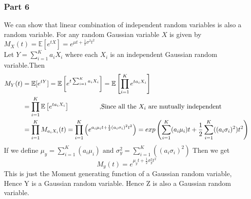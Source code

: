 \subsubsection{Part 6}
    We can show that linear combination of independent random variables is also a random variable. For any random Gaussian variable $X$ is given by $M_X(t)=\mathbb{E}[e^{tX}]=e^{\mu t+\frac{1}{2} \sigma^2t^2}$\\
    Let $Y=\sum_{i=1}^K a_i X_i$ where each $X_i$ is an independent Gaussian random variable.Then 
    \begin{align*}
        M_Y(t) &= \mathbb{E}[e^{tY}]= \mathbb{E}\left[e^{t\sum_{i=1}^K a_i X_i}\right] = \mathbb{E}\left[\prod_{i=1}^Ke^{ta_i X_i}\right]\\
        &=\prod_{i=1}^K\mathbb{E}\left[e^{ta_i X_i}\right] \hspace{15mm} \text{ ,Since all the $X_i$ are mutually independent}\\
        &= \prod_{i=1}^KM_{a_iX_i}(t) =\prod_{i=1}^K\left(  e^{a_i\mu_i t+\frac{1}{2} (a_i\sigma_i)^2t^2}\right) = exp\left({\sum_{i=1}^K(a_i\mu_i) t+\frac{1}{2} \sum_{i=1}^K((a_i\sigma_i)^2)t^2}\right)\\
    \end{align*}
    If we define $\mu_y = \sum_{i=1}^K(a_i\mu_i)\text{ and }\sigma_y^2 = \sum_{i=1}^K((a_i\sigma_i)^2)$ Then we get 
    \begin{equation}
        M_y(t) = e^{\mu_y t+\frac{1}{2} \sigma_y^2t^2}
    \end{equation}
    This is just the Moment generating function of a Gaussian random variable, Hence Y is a Gaussian random variable. Hence Z is also a Gaussian random variable.

    
